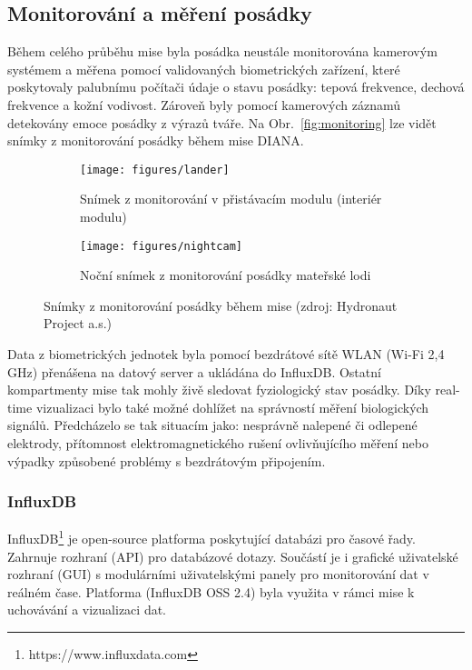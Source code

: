 \subsection{Monitorování a měření posádky}
\label{subsec:monitorovani posadky}
Během celého průběhu mise byla posádka neustále monitorována kamerovým systémem
a měřena pomocí validovaných biometrických zařízení, které poskytovaly palubnímu
počítači údaje o stavu posádky: tepová frekvence, dechová frekvence a kožní
vodivost. Zároveň byly pomocí kamerových záznamů detekovány emoce posádky z
výrazů tváře. Na Obr.~\ref{fig:monitoring} lze vidět snímky z monitorování
posádky během mise DIANA.

\begin{figure}[h]
    \begin{subfigure}[h]{0.48\linewidth}
        \texttt{[image: figures/lander]}
        \caption{Snímek z monitorování v přistávacím modulu (interiér modulu)}
    \end{subfigure}
    \hfill
    \begin{subfigure}[h]{0.48\linewidth}
        \texttt{[image: figures/nightcam]}
        \caption{Noční snímek z monitorování posádky mateřské lodi}
    \end{subfigure}
    \caption{Snímky z monitorování posádky během mise (zdroj: Hydronaut Project a.s.)}
\end{figure}

Data z biometrických jednotek byla pomocí bezdrátové sítě WLAN (Wi-Fi 2,4 GHz)
přenášena na datový server a ukládána do InfluxDB. Ostatní kompartmenty mise tak
mohly živě sledovat fyziologický stav posádky. Díky real-time vizualizaci bylo
také možné dohlížet na správností měření biologických signálů. Předcházelo se
tak situacím jako: nesprávně nalepené či odlepené elektrody, přítomnost
elektromagnetického rušení ovlivňujícího měření nebo výpadky způsobené problémy
s bezdrátovým připojením.

\subsubsection{InfluxDB}
\label{subsec:influx}
InfluxDB\footnote{https://www.influxdata.com} je open-source platforma
poskytující databázi pro časové řady. Zahrnuje rozhraní (API) pro databázové
dotazy. Součástí je i grafické uživatelské rozhraní (GUI) s modulárními
uživatelskými panely pro monitorování dat v reálném čase. Platforma (InfluxDB
OSS 2.4) byla využita v rámci mise k uchovávání a vizualizaci dat.

